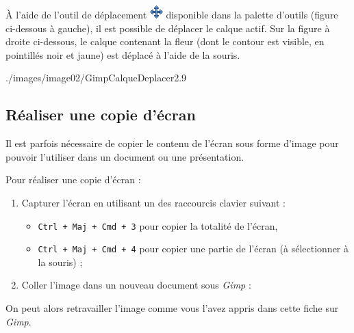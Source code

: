 À l'aide de l'outil de déplacement \includegraphics[width=.4cm]{./images/image02/iconeDeplacement} disponible dans la palette d'outils (figure ci-dessous à gauche), il est possible de déplacer le calque actif. Sur la figure à droite ci-dessous, le calque contenant la fleur (dont le contour est visible, en pointillés noir et jaune) est déplacé à l'aide de la souris. 

%
              {./images/image02/GimpCalqueDeplacer2}{.9\textwidth}






\subsection{Réaliser une copie d'écran}\label{CaptureEcran2}

Il est parfois nécessaire de copier le contenu de l'écran sous forme d'image pour pouvoir l'utiliser dans un document ou une présentation.

\vspace{12pt}

Pour réaliser une copie d'écran :

\begin{enumerate}
\item Capturer l'écran en utilisant un des raccourcis clavier suivant :
        \begin{itemize}
        \item \texttt{Ctrl + Maj + Cmd + 3} pour copier la totalité de l'écran,
        \item \texttt{Ctrl + Maj + Cmd + 4} pour copier une partie de l'écran (à sélectionner à la souris) ;
        \end{itemize} 


\item Coller l'image dans un nouveau document sous \emph{Gimp} : 
\end{enumerate}


On peut alors retravailler l'image comme vous l'avez appris dans cette fiche sur \emph{Gimp}. 

